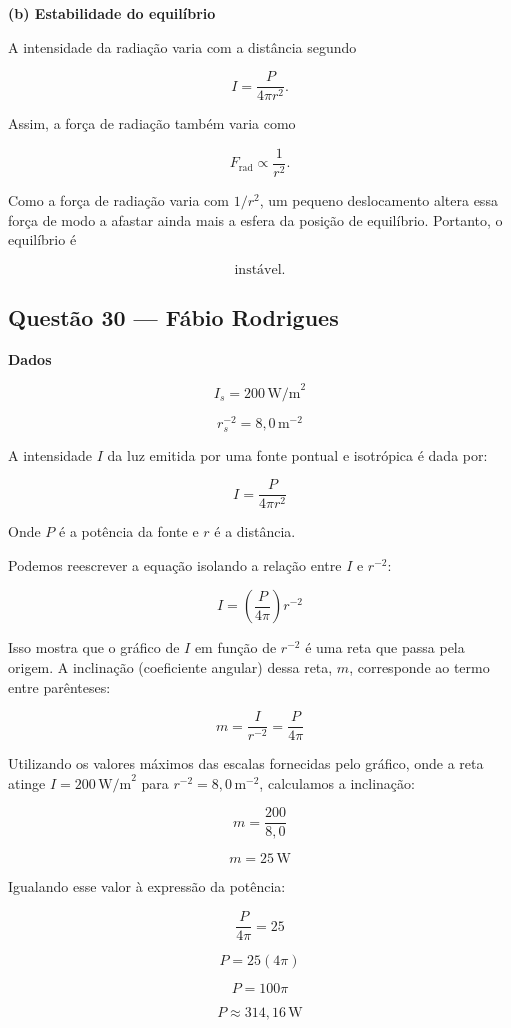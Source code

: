 \documentclass[12pt,a4paper]{article}
\begin{document}
\bigskip

\textbf{(b) Estabilidade do equilíbrio}

A intensidade da radiação varia com a distância segundo

\[
I=\frac{P}{4\pi r^2}.
\]

Assim, a força de radiação também varia como

\[
F_{\text{rad}}\propto \frac{1}{r^2}.
\]

Como a força de radiação varia com \(1/r^2\), um pequeno deslocamento altera essa força de modo a afastar ainda mais a esfera da posição de equilíbrio. Portanto, o equilíbrio é

\[
\boxed{\text{instável}}.
\]

\subsection{Questão 30 — Fábio Rodrigues}
\textbf{Dados}

\[
I_s = 200\,\text{W/m}^2
\]

\[
r_s^{-2} = 8,0\,\text{m}^{-2}
\]

A intensidade \(I\) da luz emitida por uma fonte pontual e isotrópica é dada por:

\[
I = \frac{P}{4\pi r^2}
\]

Onde \(P\) é a potência da fonte e \(r\) é a distância.

Podemos reescrever a equação isolando a relação entre \(I\) e \(r^{-2}\):

\[
I = \left(\frac{P}{4\pi}\right) r^{-2}
\]

Isso mostra que o gráfico de \(I\) em função de \(r^{-2}\) é uma reta que passa pela origem. A inclinação (coeficiente angular) dessa reta, \(m\), corresponde ao termo entre parênteses:

\[
m = \frac{I}{r^{-2}} = \frac{P}{4\pi}
\]

Utilizando os valores máximos das escalas fornecidas pelo gráfico, onde a reta atinge \(I = 200\,\text{W/m}^2\) para \(r^{-2} = 8,0\,\text{m}^{-2}\), calculamos a inclinação:

\[
m = \frac{200}{8,0}
\]

\[
m = 25\,\text{W}
\]

Igualando esse valor à expressão da potência:

\[
\frac{P}{4\pi} = 25
\]

\[
P = 25(4\pi)
\]

\[
P = 100\pi
\]

\[
P \approx 314,16\,\text{W}
\]
\end{document}
